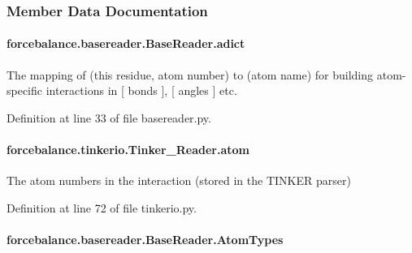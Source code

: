 \subsubsection{Member Data Documentation}
\hypertarget{classforcebalance_1_1basereader_1_1BaseReader_a84a513e0e43145b2fdaf38e73c32f83a}{
\paragraph[{adict}]{\setlength{\rightskip}{0pt plus 5cm}forcebalance.\-basereader.\-Base\-Reader.\-adict\hspace{0.3cm}{\ttfamily [inherited]}}}\label{classforcebalance_1_1basereader_1_1BaseReader_a84a513e0e43145b2fdaf38e73c32f83a}


The mapping of (this residue, atom number) to (atom name) for building atom-\/specific interactions in \mbox{[} bonds \mbox{]}, \mbox{[} angles \mbox{]} etc. 



Definition at line 33 of file basereader.\-py.

\hypertarget{classforcebalance_1_1tinkerio_1_1Tinker__Reader_a77b335b67d8e723248ac52515867607d}{
\paragraph[{atom}]{\setlength{\rightskip}{0pt plus 5cm}forcebalance.\-tinkerio.\-Tinker\-\_\-\-Reader.\-atom}}\label{classforcebalance_1_1tinkerio_1_1Tinker__Reader_a77b335b67d8e723248ac52515867607d}


The atom numbers in the interaction (stored in the T\-I\-N\-K\-E\-R parser) 



Definition at line 72 of file tinkerio.\-py.

\hypertarget{classforcebalance_1_1basereader_1_1BaseReader_ad5765e192499937376950410364014af}{
\paragraph[{Atom\-Types}]{\setlength{\rightskip}{0pt plus 5cm}forcebalance.\-basereader.\-Base\-Reader.\-Atom\-Types\hspace{0.3cm}{\ttfamily [inherited]}}}\label{classforcebalance_1_1basereader_1_1BaseReader_ad5765e192499937376950410364014af}


